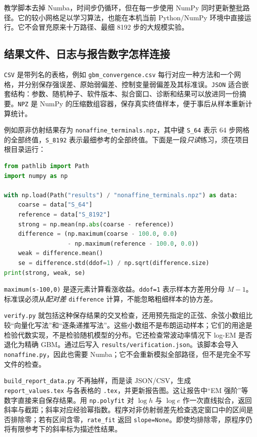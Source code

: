 \documentclass[11pt,a4paper,fontset=none]{ctexart}
\numberwithin{equation}{section}
\begin{document}
教学脚本去掉 Numba，时间步仍循环，但在每一步使用 NumPy 同时更新整批路径。它的较小网格足以学习算法，也能在本机当前 Python/NumPy 环境中直接运行。它不会冒充原来十万路径、最细 8192 步的大规模实验。

\subsection{结果文件、日志与报告数字怎样连接}

\texttt{CSV} 是带列名的表格，例如 \texttt{gbm\_convergence.csv} 每行对应一种方法和一个网格，并分别保存强误差、原始弱偏差、控制变量弱偏差及其标准误。\texttt{JSON} 适合嵌套结构：参数、随机种子、软件版本、拟合窗口、诊断和结果可以放进同一份摘要。\texttt{NPZ} 是 NumPy 的压缩数组容器，保存真实终值样本，便于事后从样本重新计算统计。

例如原非仿射结果存为 \texttt{nonaffine\_terminals.npz}，其中键 \texttt{S\_64} 表示 64 步网格的全部终值，\texttt{S\_8192} 表示最细参考的全部终值。下面是一段\emph{只读}练习，须在项目根目录运行：
\begin{lstlisting}[language=Python]
from pathlib import Path
import numpy as np

with np.load(Path("results") / "nonaffine_terminals.npz") as data:
    coarse = data["S_64"]
    reference = data["S_8192"]
    strong = np.mean(np.abs(coarse - reference))
    difference = (np.maximum(coarse - 100.0, 0.0)
                  - np.maximum(reference - 100.0, 0.0))
    weak = difference.mean()
    se = difference.std(ddof=1) / np.sqrt(difference.size)
print(strong, weak, se)
\end{lstlisting}
\texttt{maximum(s-100,0)} 是逐元素计算看涨收益。\texttt{ddof=1} 表示样本方差用分母 $M-1$。标准误必须从\emph{配对差} \texttt{difference} 计算，不能忽略粗细样本的协方差。

\texttt{verify.py} 就包括这种保存结果的交叉检查，还用预先指定的正弦、余弦小数组比较“向量化写法”和“逐条递推写法”。这些小数组不是布朗运动样本；它们的用途是检验代数实现，不是检验随机模型的分布。它还检查常波动率情况下 log-EM 是否退化为精确 GBM。通过后写入 \texttt{results/verification.json}。该脚本会导入 \texttt{nonaffine.py}，因此也需要 Numba；它不会重新模拟全部路径，但不是完全不写文件的检查。

\texttt{build\_report\_data.py} 不再抽样，而是读 JSON/CSV，生成 \texttt{report\_values.tex} 与各表格的 \texttt{.tex}，并更新报告图。这让报告中“EM 强阶”等数字直接来自保存结果。用 \texttt{np.polyfit} 对 $\log h$ 与 $\log e$ 作一次直线拟合，返回斜率与截距；斜率对应经验幂指数。程序对非仿射弱差先检查选定窗口中的区间是否排除零；若有区间含零，\texttt{rate\_fit} 返回 \texttt{slope=None}。即使均排除零，原程序仍将有限参考下的斜率标为描述性结果。
\end{document}

